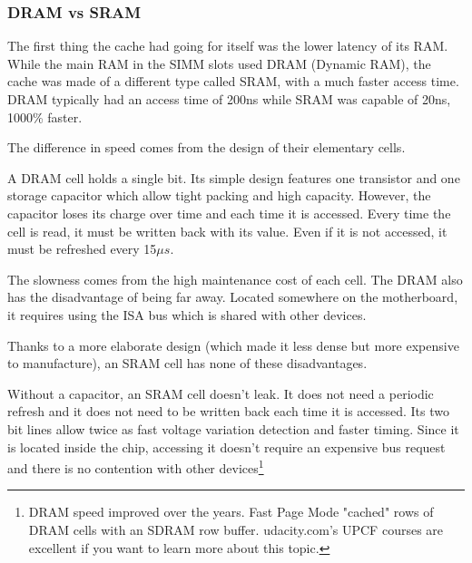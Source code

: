 \subsubsection{DRAM vs SRAM}
The first thing the cache had going for itself was the lower latency of its RAM. While the main RAM in the SIMM slots used DRAM (Dynamic RAM), the cache was made of a different type called SRAM, with a much faster access time. DRAM typically had an access time of 200ns while SRAM was capable of 20ns, 1000\% faster. \\
\par
The difference in speed comes from the design of their elementary cells.\\
\par
 A DRAM cell holds a single bit. Its simple design features one transistor and one storage capacitor which allow tight packing and high capacity. However, the capacitor loses its charge over time and each time it is accessed. Every time the cell is read, it must be written back with its value. Even if it is not accessed, it must be refreshed every 15$\mu s$.\\
\par
{}
\vspace{-5pt}
The slowness comes from the high maintenance cost of each cell. The DRAM also has the disadvantage of being far away. Located somewhere on the motherboard, it requires using the ISA bus which is shared with other devices.\\
\par

\vspace{2mm}
Thanks to a more elaborate design (which made it less dense but more expensive to manufacture), an SRAM cell has none of these disadvantages.\\
\par
{}
\par
Without a capacitor, an SRAM cell doesn't leak. It does not need a periodic refresh and it does not need to be written back each time it is accessed. Its two bit lines allow twice as fast voltage variation detection and faster timing.
Since it is located inside the chip, accessing it doesn't require an expensive bus request and there is no contention with other devices\footnote{DRAM speed improved over the years. Fast Page Mode "cached" rows of DRAM cells with an SDRAM row buffer. udacity.com's UPCF courses are excellent if you want to learn more about this topic.}
\par










